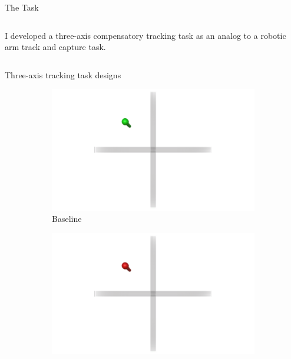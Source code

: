 \documentclass[10pt]{beamer}
\begin{document}
\begin{frame}[fragile]{The Task}
  \begin{columns}[T]
    \begin{column}{.8\textwidth}
      I developed a three-axis compensatory tracking task as an analog to a robotic arm track and capture task.
    \end{column}
  \end{columns}
\end{frame}

\begin{frame}[fragile]{Three-axis tracking task designs}
  \begin{figure}
    \begin{center}
      \begin{subfigure}{0.45\linewidth}
        \includegraphics[width=\linewidth]{../img/Baseline.png}
        \caption{Baseline}
      \end{subfigure}\hfill
      \begin{subfigure}{0.45\linewidth}
        \includegraphics[width=\linewidth]{../img/Color.png}

\end{subfigure}
\end{center}
\end{figure}
\end{frame}
\end{document}
